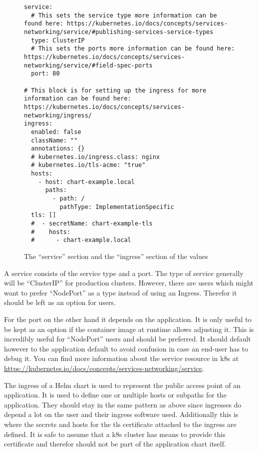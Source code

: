 \begin{figure}[h]
\begin{verbatim}
service:
  # This sets the service type more information can be found here: https://kubernetes.io/docs/concepts/services-networking/service/#publishing-services-service-types
  type: ClusterIP
  # This sets the ports more information can be found here: https://kubernetes.io/docs/concepts/services-networking/service/#field-spec-ports
  port: 80

# This block is for setting up the ingress for more information can be found here: https://kubernetes.io/docs/concepts/services-networking/ingress/
ingress:
  enabled: false
  className: ""
  annotations: {}
  # kubernetes.io/ingress.class: nginx
  # kubernetes.io/tls-acme: "true"
  hosts:
    - host: chart-example.local
      paths:
        - path: /
          pathType: ImplementationSpecific
  tls: []
  #  - secretName: chart-example-tls
  #    hosts:
  #      - chart-example.local
\end{verbatim}
\caption{The \enquote{service} section and the \enquote{ingress} section of the \gls{values}}\label{code:service_and_ingress_section}
\end{figure}

A service consists of the service type and a port.
The type of service generally will be \enquote{ClusterIP} for production clusters.
However, there are users which might want to prefer \enquote{NodePort} as a type instead of using an Ingress.
Therefor it should be left as an option for users.

For the port on the other hand it depends on the application.
It is only useful to be kept as an option if the container image at runtime allows adjusting it.
This is incredibly useful for \enquote{NodePort} users and should be preferred.
It should default however to the application default to avoid confusion in case an end-user has to debug it.
You can find more information about the service resource in \gls{k8s} at \url{https://kubernetes.io/docs/concepts/services-networking/service}.

\bigskip
The ingress of a Helm chart is used to represent the public access point of an application.
It is used to define one or multiple hosts or subpaths for the application.
They should stay in the same pattern as above since ingresses do depend a lot on the user and their ingress software used.
Additionally this is where the secrets and hosts for the tls certificate attached to the ingress are defined.
It is safe to assume that a \gls{k8s} cluster has means to provide this certificate and therefor should not be part of the application chart itself.

